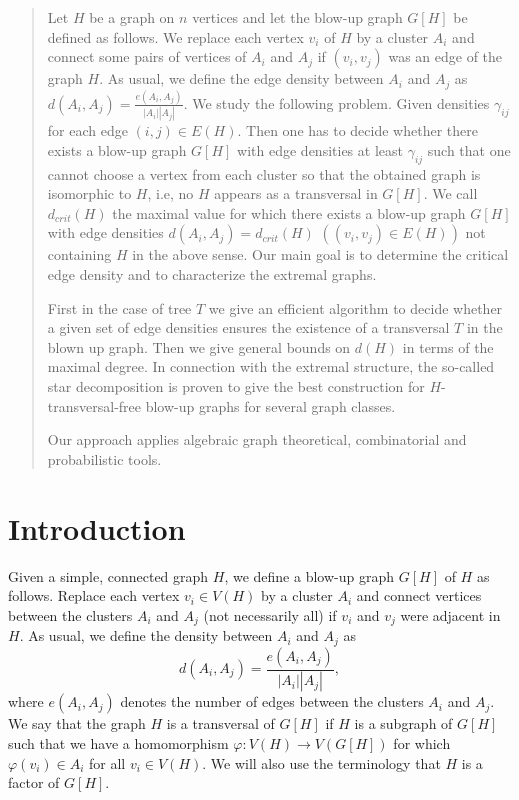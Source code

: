 \documentclass[12pt,a4paper]{amsart}
\numberwithin{equation}{section}
\begin{document}
\begin{abstract} Let $H$ be a graph on $n$ vertices and let the blow-up graph
  $G[H]$ be defined as follows. We replace each vertex $v_i$ of $H$ by a cluster
  $A_i$ and connect some pairs of vertices of $A_i$ and $A_j$ if $(v_i,v_j)$ was
  an edge of the graph $H$.  As usual, we
define the edge density between $A_i$ and $A_j$ as
$d(A_i,A_j)=\frac{e(A_i,A_j)}{|A_i||A_j|}.$
We study the following problem. Given densities $\gamma_{ij}$  for each edge
$(i,j)\in E(H)$. Then one has
to decide whether there exists a blow-up graph $G[H]$ with edge densities at
least  $\gamma_{ij}$ such that one cannot choose a vertex from each cluster so
that the obtained graph is isomorphic to $H$, i.e, no $H$ appears as a
transversal in $G[H]$.  We call $d_{crit}(H)$ the
maximal value for which there exists a blow-up graph $G[H]$ with edge
densities $d(A_i,A_j)=d_{crit}(H)$ $((v_i,v_j)\in E(H))$ not containing $H$ in the
above sense. Our main goal is to determine the critical edge density and to
characterize the extremal graphs.

First in the case of tree $T$ we give an efficient algorithm to decide
whether a  given set of edge densities ensures the existence of a transversal
$T$ in the blown up graph. Then we give general bounds on $d(H)$ in terms of
the maximal degree. In connection  with the extremal structure, the so-called
star  decomposition  is proven to give the best construction for
$H$-transversal-free blow-up graphs for several graph classes. 

Our approach applies algebraic graph theoretical, combinatorial and
probabilistic tools. 
\end{abstract}

\maketitle

\section{Introduction} 

Given a simple, connected  graph $H$, we define a blow-up graph $G[H]$ of $H$
as follows.  Replace each
vertex $v_i\in V(H)$ by a cluster $A_i$ and connect vertices between the
clusters $A_i$ and $A_j$ (not necessarily all) if $v_i$ and $v_j$ were adjacent
in $H$.  As usual, we
define the density between $A_i$ and $A_j$ as
$$d(A_i,A_j)=\frac{e(A_i,A_j)}{|A_i||A_j|},$$
where $e(A_i,A_j)$ denotes the number of edges between the clusters $A_i$ and
$A_j$. We say that the graph $H$ is a transversal of $G[H]$ if $H$ is a
subgraph of $G[H]$ such that we have a homomorphism $\varphi:
V(H)\rightarrow V(G[H])$ for which $\varphi(v_i)\in A_i$ for all
$v_i\in V(H)$.  We will
also use the terminology that $H$ is a factor of $G[H]$. 
\end{document}
